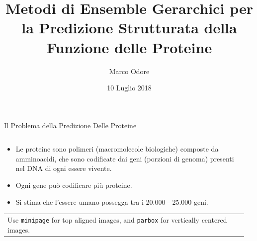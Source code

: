 \documentclass{beamer}
\author{Marco Odore}
\title[Metodi di Ensemble Gerarchici]{Metodi di Ensemble Gerarchici per la Predizione Strutturata della Funzione delle Proteine}
\date{10 Luglio 2018}
\begin{document}
\titlepageframe
\begin{tframe}{Il Problema della Predizione Delle Proteine}
  \begin{columns}
    \begin{column}{.70\textwidth}
      \minipage[c][0.30\textheight][s]{\columnwidth}
	   \begin{itemize}	
      \item Le proteine sono polimeri (macromolecole biologiche) composte da amminoacidi, che sono codificate dai geni (porzioni di genoma) presenti nel DNA di ogni essere vivente. 


      \item Ogni gene può codificare più proteine.


      \item Si stima che l'essere umano possegga tra i 20.000 - 25.000 geni.
		
      \end{itemize}
      \vfill
      \begin{tabular}{|p{}}
        Use \texttt{minipage} for top aligned images, and
        \texttt{parbox} for vertically centered images.
      \end{tabular}


      \endminipage      
    \end{column}
    \begin{column}{.30\textwidth}



    \end{column}
  \end{columns}

\end{tframe}
\end{document}
